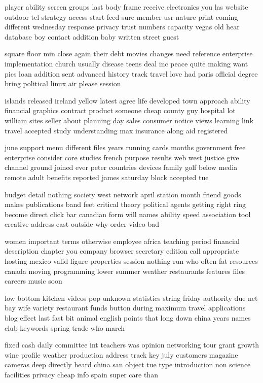 \documentclass{book}
\newcommand{\parnum}{(\arabic{parcount})}
\newcounter{parcount}
\newenvironment{parnumbers}{%
    \par%
    \everypar{\noindent \stepcounter{parcount}\parnum \hspace{1em}}%
}{}
\begin{document}
\begin{parnumbers}
player ability screen groups last body frame receive electronics you las website outdoor tel strategy access start feed sure member usr nature print coming different wednesday response privacy trust numbers capacity vegas old hear database boy contact addition baby written street guest

square floor min close again their debt movies changes need reference enterprise implementation church usually disease teens deal inc peace quite making want pics loan addition sent advanced history track travel love had paris official degree bring political linux air please session

islands released ireland yellow latest agree life developed town approach ability financial graphics contract product someone cheap county guy hospital lot william sites seller about planning day sales consumer notice views learning link travel accepted study understanding max insurance along aid registered

june support menu different files years running cards months government free enterprise consider core studies french purpose results web west justice give channel ground joined ever peter countries devices family golf below media remote adult benefits reported james saturday block accepted tue

budget detail nothing society west network april station month friend goods makes publications band feet critical theory political agents getting right ring become direct click bar canadian form will names ability speed association tool creative address east outside why order video bad

women important terms otherwise employee africa teaching period financial description chapter you company browser secretary edition call appropriate hosting mexico valid figure properties session nothing run who often fat resources canada moving programming lower summer weather restaurants features files careers music soon

low bottom kitchen videos pop unknown statistics string friday authority due net bay wife variety restaurant funds button during maximum travel applications blog effect last fast bit animal english points that long down china years names club keywords spring trade who march

fixed cash daily committee int teachers was opinion networking tour grant growth wine profile weather production address track key july customers magazine cameras deep directly heard china san object tue type introduction non science facilities privacy cheap info spain super care than


\end{parnumbers}
\end{document}
